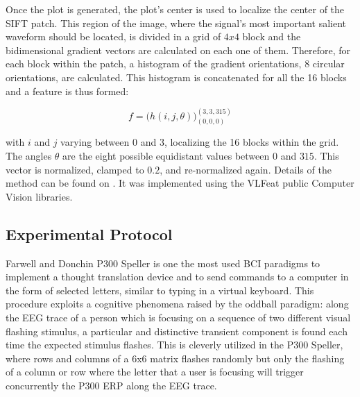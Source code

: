\documentclass[brainsci,article,submit,moreauthors,pdftex,10pt,a4paper]{mdpi}
\begin{document}
Once the plot is generated, the plot's center is used to localize the center of the SIFT patch. This region of the image, where the signal's most important salient waveform should be located, is divided in a grid of $4 x 4$ block and the bidimensional gradient vectors are calculated on each one of them.  Therefore, for each block within the patch, a histogram of the gradient orientations, 8 circular orientations, are calculated.  This histogram is concatenated for all the 16 blocks and a feature is thus formed:

\begin{equation}
f = {\bigg ( h(i,j,\theta) \bigg )}_{(0,0,0)}^{(3,3,315)}
\label{eq:sift7}
\end{equation}

\noindent with $i$ and $j$ varying between $0$ and $3$, localizing the 16 blocks within the grid. The angles $\theta$ are the eight possible equidistant values between $0$ and $315$.  This vector is normalized, clamped to $0.2$, and re-normalized again.   Details of the method can be found on \citep{Ramele2016,Lowe2004}.  It was implemented using the VLFeat  \citep{Vedaldi2010} public Computer Vision libraries.



\subsection{Experimental Protocol}
\label{Experimental}

Farwell and Donchin P300 Speller \citep{Farwell1988} is one the most used BCI paradigms to implement a thought translation device and to send commands to a computer in the form of selected letters, similar to typing in a virtual keyboard.  This procedure exploits a cognitive phenomena raised by the oddball paradigm: along the EEG trace of a person which is focusing on a sequence of two different visual flashing stimulus, a particular and distinctive transient component is found each time the expected stimulus flashes.  This is cleverly utilized in the P300 Speller, where rows and columns of a 6x6 matrix flashes randomly but only the flashing of a column or row where the letter that a user is focusing will trigger concurrently the P300 ERP along the EEG trace.
\end{document}
